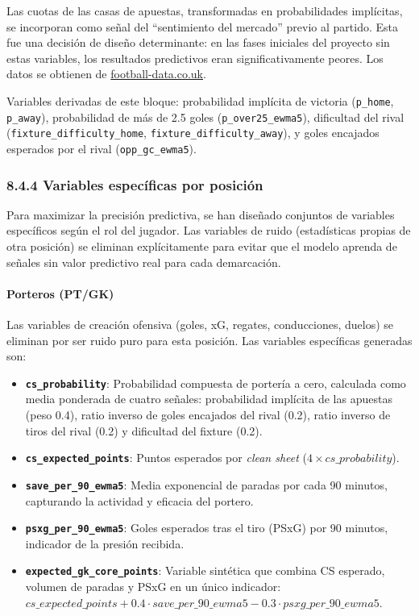Las cuotas de las casas de apuestas, transformadas en probabilidades implícitas, se
incorporan como señal del ``sentimiento del mercado'' previo al partido. Esta fue una
decisión de diseño determinante: en las fases iniciales del proyecto sin estas variables,
los resultados predictivos eran significativamente peores. Los datos se obtienen de
\href{https://www.football-data.co.uk/spainm.php}{football-data.co.uk}.
 
Variables derivadas de este bloque: probabilidad implícita de victoria (\texttt{p\_home},
\texttt{p\_away}), probabilidad de más de 2.5 goles (\texttt{p\_over25\_ewma5}), dificultad
del rival (\texttt{fixture\_difficulty\_home}, \texttt{fixture\_difficulty\_away}), y
goles encajados esperados por el rival (\texttt{opp\_gc\_ewma5}).
 
\subsubsection{8.4.4 Variables específicas por posición}
 
Para maximizar la precisión predictiva, se han diseñado conjuntos de variables específicos
según el rol del jugador. Las variables de ruido (estadísticas propias de otra posición)
se eliminan explícitamente para evitar que el modelo aprenda de señales sin valor
predictivo real para cada demarcación.
 
\paragraph{Porteros (PT/GK)}
 
Las variables de creación ofensiva (goles, xG, regates, conducciones, duelos) se eliminan
por ser ruido puro para esta posición. Las variables específicas generadas son:
 
\begin{itemize}
    \item \textbf{\texttt{cs\_probability}}: Probabilidad compuesta de portería a cero,
    calculada como media ponderada de cuatro señales: probabilidad implícita de las apuestas
    (peso 0.4), ratio inverso de goles encajados del rival (0.2), ratio inverso de tiros
    del rival (0.2) y dificultad del fixture (0.2).
    \item \textbf{\texttt{cs\_expected\_points}}: Puntos esperados por \textit{clean sheet}
    ($4 \times cs\_probability$).
    \item \textbf{\texttt{save\_per\_90\_ewma5}}: Media exponencial de paradas por cada
    90 minutos, capturando la actividad y eficacia del portero.
    \item \textbf{\texttt{psxg\_per\_90\_ewma5}}: Goles esperados tras el tiro (PSxG)
    por 90 minutos, indicador de la presión recibida.
    \item \textbf{\texttt{expected\_gk\_core\_points}}: Variable sintética que combina
    CS esperado, volumen de paradas y PSxG en un único indicador:
    $cs\_expected\_points + 0.4 \cdot save\_per\_90\_ewma5 - 0.3 \cdot psxg\_per\_90\_ewma5$.
\end{itemize}
 

